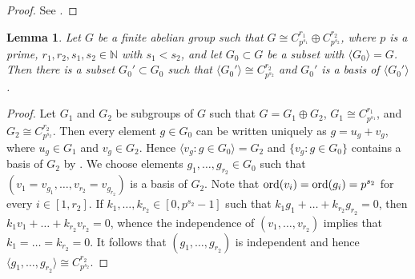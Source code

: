 \documentclass[a4paper,10pt]{amsart}
\theoremstyle{plain}
\newtheorem{lemma}[theorem]{\bf Lemma}
\theoremstyle{definition}
\newcommand{\N}{\mathbb N}
\numberwithin{equation}{section}
\begin{document}
\begin{proof}
See \cite[Lemma 3.10]{Ge-Zh18a}.
\end{proof}


\begin{lemma} \label{3.2}
Let $G$ be a finite abelian group such that $G \cong C_{p^{s_1}}^{r_1} \oplus C_{p^{s_2}}^{r_2}$, where $p$ is a prime, $r_1, r_2, s_1,s_2 \in \N$ with $s_1<s_2$, and let $G_0 \subset G$ be a subset with $\langle G_0\rangle =G$. Then there is a subset $G_0' \subset G_0$ such that $\langle G_0' \rangle \cong C_{p^{s_2}}^{r_2}$ and $G_0'$ is a basis of $\langle G_0' \rangle$.
\end{lemma}

\begin{proof}
Let $G_1$ and $G_2$ be subgroups of $G$ such that $G=G_1\oplus G_2$,  $G_1 \cong C_{p^{s_1}}^{r_1} $, and $G_2\cong C_{p^{s_2}}^{r_2}$. Then every element $g\in G_0$ can be written uniquely as $g=u_g+v_g$, where $u_g\in G_1$ and $v_g\in G_2$. Hence $\langle v_g\colon g\in G_0\rangle=G_2$ and $\{v_g\colon  g\in G_0\}$ contains a basis of $G_2$ by \cite[Lemma A.7.3]{Ge-HK06a}. We choose elements $g_1, \ldots, g_{r_2}\in G_0$ such that $(v_1=v_{g_1}, \ldots, v_{r_2}=v_{g_{r_2}})$ is a basis of $G_2$. Note that $\operatorname{ord}(v_i)=\operatorname{ord}(g_i)=p^{s_2}$ for every $i\in [1,r_2]$.
If $k_1,\ldots, k_{r_2}\in [0, p^{s_2}-1]$ such that $k_1g_1+\ldots +k_{r_2}g_{r_2}=0$, then $k_1v_1+\ldots+k_{r_2}v_{r_2}=0$,  whence the independence of $(v_1,\ldots, v_{r_2})$ implies that $k_1=\ldots=k_{r_2}=0$. It follows that $(g_1,\ldots, g_{r_2})$ is independent and hence $\langle g_1,\ldots, g_{r_2}\rangle \cong C_{p^{s_2}}^{r_2}$.
\end{proof}
\end{document}
